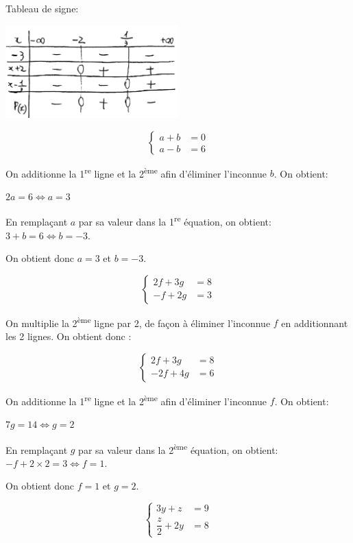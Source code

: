 \documentclass[a4paper,12pt]{scrartcl}
\begin{document}
Tableau de signe:

\includegraphics[width=0.5\textwidth]{pics/4.png}


\question{}
$$
\begin{cases} 
a+b &= 0 \\
a-b &= 6
\end{cases}
$$

On additionne la 1\textsuperscript{re} ligne et la 2\textsuperscript{ème} afin d'éliminer l'inconnue $b$. On obtient:

$2a = 6 \Leftrightarrow a = 3$

En remplaçant $a$ par sa valeur dans la 1\textsuperscript{re} équation, on obtient: $3 + b=6 \Leftrightarrow b = -3$. 

On obtient donc $a = 3$ et $b = -3$.

\question{}
$$
\begin{cases} 
2f+3g &= 8 \\
-f+2g &= 3
\end{cases}
$$

On multiplie la 2\textsuperscript{ème} ligne par 2, de façon à éliminer l'inconnue $f$ en additionnant les 2 lignes. On obtient donc :

$$
\begin{cases} 
2f+3g &= 8 \\
-2f+4g &= 6
\end{cases}
$$

On additionne la 1\textsuperscript{re} ligne et la 2\textsuperscript{ème} afin d'éliminer l'inconnue $f$. On obtient:

$7g = 14 \Leftrightarrow g = 2$

En remplaçant $g$ par sa valeur dans la 2\textsuperscript{ème} équation, on obtient: $-f + 2 \times 2 = 3 \Leftrightarrow f = 1$. 

On obtient donc $f = 1$ et $g = 2$.

\question{}
$$
\begin{cases} 
3y+z &= 9 \\
\dfrac{z}{2} + 2y &= 8
\end{cases}
$$
\end{document}
